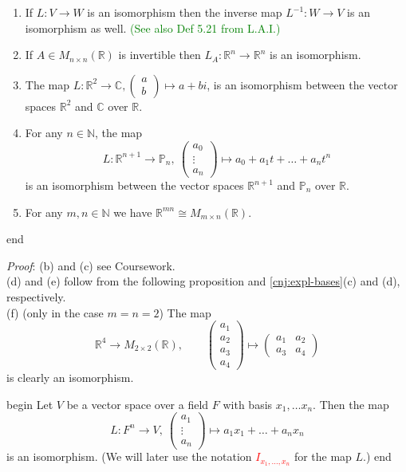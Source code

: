 \documentclass[
  12pt,
  a4paper,
  twoside]{article}
\theoremstyle{plain}
\theoremstyle{definition}
\begin{document}
\begin{enumerate}
\def\labelenumi{(\alph{enumi})}
\setcounter{enumi}{1}
\item
  If \(L: V \to W\) is an isomorphism then the inverse map \(L^{-1} : W \to V\) is an isomorphism as well. \textcolor{green}{(See also Def 5.21 from L.A.I.)}
\item
  If \(A \in M_{n \times n}(\mathbb{R})\) is invertible then \(L_{A}: \mathbb{R}^{n} \to \mathbb{R}^{n}\) is an isomorphism.
\item
  The map \(L: \mathbb{R}^{2} \to \mathbb{C}, \begin{pmatrix} a \\ b \end{pmatrix} \mapsto a + bi\), is an isomorphism between the vector spaces \(\mathbb{R}^{2}\) and \(\mathbb{C}\) over \(\mathbb{R}\).
\item
  For any \(n \in \mathbb{N}\), the map
  \[ L: \mathbb{R}^{n+1} \to \mathbb{P}_{n}, \ \begin{pmatrix} a_{0}\\ \vdots\\ a_{n} \end{pmatrix} \mapsto a_{0} + a_{1}t + \dots + a_{n}t^{n} \]
  is an isomorphism between the vector spaces \(\mathbb{R}^{n+1}\) and \(\mathbb{P}_{n}\) over \(\mathbb{R}\).
\item
  For any \(m,n \in \mathbb{N}\) we have \(\mathbb{R}^{m n} \cong M_{m \times n}(\mathbb{R})\).
\end{enumerate}

\csname end

\emph{Proof}:
(b) and (c) see Coursework.\\
(d) and (e) follow from the following proposition and \ref{cnj:expl-bases}(c) and (d), respectively.\\
(f) (only in the case \(m=n=2\)) The map
\[
\mathbb{R}^4 \to M_{2\times 2}(\mathbb{R}), \qquad \begin{pmatrix}
a_1\\a_2\\a_3\\a_4
\end{pmatrix} \mapsto \begin{pmatrix}
a_1 & a_2\\
a_3 & a_4
\end{pmatrix}
\]
is clearly an isomorphism.

\csname begin\label{cnj:prop-iso-basis}
Let \(V\) be a vector space over a field \(F\) with basis \(x_{1}, \dots x_{n}\). Then the map
\[ L: F^{n} \to V, \ \begin{pmatrix} a_{1} \\ \vdots \\ a_{n} \end{pmatrix} \mapsto a_{1}x_{1} + \dots + a_{n}x_{n} \]
is an isomorphism. (We will later use the notation \textcolor{red}{$I_{x_{1}, \dots,  x_{n}}$} for the map \(L\).)
\csname end
\end{document}
